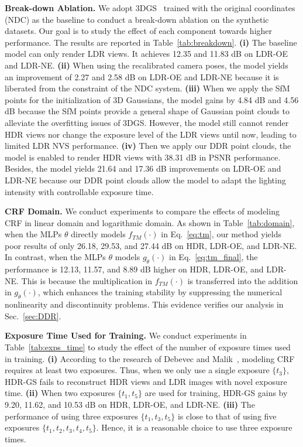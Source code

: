 \documentclass{article}
\begin{document}
\vspace{1mm}
\noindent \textbf{Break-down Ablation.} We adopt 3DGS~\cite{3dgs} trained with the original coordinates (NDC) as the baseline to conduct a break-down ablation on the synthetic datasets. Our goal is to study the effect of each component towards higher performance. The results are reported in Table~\ref{tab:breakdown}. \textbf{(i)} The baseline model can only render LDR views. It achieves 12.35 and 11.83 dB on LDR-OE and LDR-NE. \textbf{(ii)} When using the recalibrated camera poses, the model yields an improvement of 2.27 and 2.58 dB on LDR-OE and LDR-NE because it is liberated from the constraint of the NDC system. \textbf{(iii)} When we apply the SfM points for the initialization of 3D Gaussians, the model gains by 4.84 dB and 4.56 dB because the SfM points provide a general shape of Gaussian point clouds to alleviate the overfitting issues of 3DGS. However, the model still cannot render HDR views nor change the exposure level of the LDR views until now, leading to limited LDR NVS performance. \textbf{(iv)} Then we apply our DDR point clouds, the model is enabled to render HDR views with 38.31 dB in PSNR performance. Besides, the model yields 21.64 and 17.36 dB improvements on LDR-OE and LDR-NE because our DDR point clouds allow the model to adapt the lighting intensity with controllable exposure time.



\noindent \textbf{CRF Domain.} %
We conduct experiments to compare the effects of modeling CRF in linear domain and logarithmic domain. As shown in Table~\ref{tab:domain}, when the MLPs $\theta$ directly models {\small $f_{TM}(\cdot)$} in Eq.~\eqref{eq:tm}, our method yields poor results of only 26.18, 29.53, and 27.44 dB on HDR, LDR-OE, and LDR-NE. In contrast, when the MLPs $\theta$ models $g_{\theta}(\cdot)$ in Eq.~\eqref{eq:tm_final}, the performance is 12.13, 11.57, and 8.89 dB higher on HDR, LDR-OE, and LDR-NE. This is because the multiplication in {\small $f_{TM}(\cdot)$} is transferred into the addition in $g_{\theta}(\cdot)$, which enhances the training stability by suppressing the numerical nonlinearity and discontinuity problems. This evidence verifies our analysis in Sec.~\ref{sec:DDR}.

\vspace{1mm}
\noindent \textbf{Exposure Time Used for Training.} We conduct experiments in Table~\ref{tab:exps_time} to study the effect of the number of exposure times used in training. \textbf{(i)} According to the research of Debevec and Malik~\cite{malik}, modeling CRF requires at least two exposures. Thus, when we only use a single exposure $\{t_3\}$, HDR-GS fails to reconstruct HDR views and LDR images with novel exposure time. \textbf{(ii)} When two exposures $\{t_1, t_5\}$ are used for training, HDR-GS gains by 9.20, 11.62, and 10.53 dB on HDR, LDR-OE, and LDR-NE. \textbf{(iii)} The performance of using three exposures $\{t_1, t_3, t_5\}$ is close to that of using five exposures $\{t_1, t_2, t_3, t_4, t_5\}$. Hence, it is a reasonable choice to use three exposure times.
\end{document}
